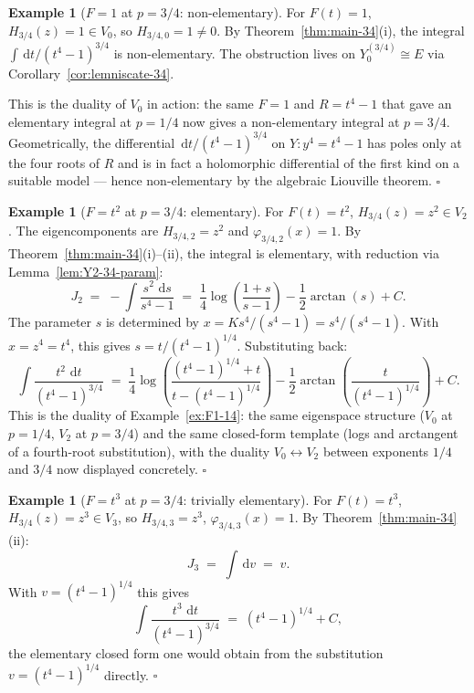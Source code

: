 \documentclass[11pt,a4paper]{article}
\theoremstyle{plain}
\theoremstyle{definition}
\newtheorem{example}[theorem]{Example}
\theoremstyle{remark}
\renewcommand{\d}{\,\mathrm{d}}
\begin{document}
\begin{example}[$F = 1$ at $p = 3/4$: non-elementary]\label{ex:F1-34}
For $F(t) = 1$, $H_{3/4}(z) = 1 \in V_0$, so $H_{3/4, 0} = 1 \neq 0$. By Theorem~\ref{thm:main-34}(i), the integral $\int \d t/(t^4 - 1)^{3/4}$ is non-elementary. The obstruction lives on $Y_0^{(3/4)} \cong E$ via Corollary~\ref{cor:lemniscate-34}.

This is the duality of $V_0$ in action: the same $F = 1$ and $R = t^4 - 1$ that gave an elementary integral at $p = 1/4$ now gives a non-elementary integral at $p = 3/4$. Geometrically, the differential $\d t/(t^4-1)^{3/4}$ on $Y\colon y^4 = t^4 - 1$ has poles only at the four roots of $R$ and is in fact a holomorphic differential of the first kind on a suitable model — hence non-elementary by the algebraic Liouville theorem. \hfill$\square$
\end{example}

\begin{example}[$F = t^2$ at $p = 3/4$: elementary]\label{ex:Ft2-34}
For $F(t) = t^2$, $H_{3/4}(z) = z^2 \in V_2$. The eigencomponents are $H_{3/4, 2} = z^2$ and $\varphi_{3/4, 2}(x) = 1$. By Theorem~\ref{thm:main-34}(i)--(ii), the integral is elementary, with reduction via Lemma~\ref{lem:Y2-34-param}:
\[
  J_2 \;=\; -\!\int \frac{s^2\,\d s}{s^4 - 1} \;=\; \frac{1}{4}\log\!\left(\frac{1 + s}{s - 1}\right) - \frac{1}{2}\arctan(s) + C.
\]
The parameter $s$ is determined by $x = K s^4/(s^4 - 1) = s^4/(s^4 - 1)$. With $x = z^4 = t^4$, this gives $s = t/(t^4 - 1)^{1/4}$. Substituting back:
\[
  \int \frac{t^2\,\d t}{(t^4 - 1)^{3/4}} \;=\; \frac{1}{4}\log\!\left(\frac{(t^4-1)^{1/4} + t}{t - (t^4-1)^{1/4}}\right) - \frac{1}{2}\arctan\!\left(\frac{t}{(t^4 - 1)^{1/4}}\right) + C.
\]
This is the duality of Example~\ref{ex:F1-14}: the same eigenspace structure ($V_0$ at $p = 1/4$, $V_2$ at $p = 3/4$) and the same closed-form template (logs and arctangent of a fourth-root substitution), with the duality $V_0 \leftrightarrow V_2$ between exponents $1/4$ and $3/4$ now displayed concretely. \hfill$\square$
\end{example}

\begin{example}[$F = t^3$ at $p = 3/4$: trivially elementary]\label{ex:Ft3-34}
For $F(t) = t^3$, $H_{3/4}(z) = z^3 \in V_3$, so $H_{3/4, 3} = z^3$, $\varphi_{3/4, 3}(x) = 1$. By Theorem~\ref{thm:main-34}(ii):
\[
  J_3 \;=\; \int \d v \;=\; v.
\]
With $v = (t^4 - 1)^{1/4}$ this gives
\[
  \int \frac{t^3\,\d t}{(t^4 - 1)^{3/4}} \;=\; (t^4 - 1)^{1/4} + C,
\]
the elementary closed form one would obtain from the substitution $v = (t^4 - 1)^{1/4}$ directly. \hfill$\square$
\end{example}
\end{document}
